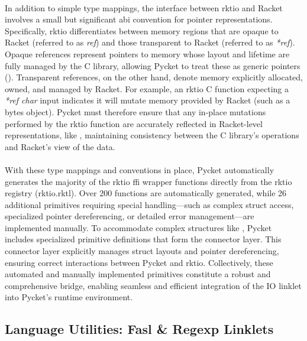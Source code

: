 				\paragraph{}%
					In addition to simple type mappings, the interface between rktio and Racket involves a small but significant \gls{abi} convention for pointer representations. Specifically, rktio differentiates between memory regions that are opaque to Racket (referred to as \emph{ref}) and those transparent to Racket (referred to as \emph{*ref}). Opaque references represent pointers to memory whose layout and lifetime are fully managed by the C library, allowing Pycket to treat these as generic pointers (). Transparent references, on the other hand, denote memory explicitly allocated, owned, and managed by Racket. For example, an rktio C function expecting a \emph{*ref char} input indicates it will mutate memory provided by Racket (such as a bytes object). Pycket must therefore ensure that any in-place mutations performed by the rktio function are accurately reflected in Racket-level representations, like , maintaining consistency between the C library's operations and Racket’s view of the data.

				\paragraph{}%
					With these type mappings and conventions in place, Pycket automatically generates the majority of the rktio \gls{ffi} wrapper functions directly from the rktio registry (rktio.rktl). Over 200 functions are automatically generated, while 26 additional primitives requiring special handling—such as complex struct access, specialized pointer dereferencing, or detailed error management—are implemented manually. To accommodate complex structures like , Pycket includes specialized primitive definitions that form the connector layer. This connector layer explicitly manages struct layouts and pointer dereferencing, ensuring correct interactions between Pycket and rktio. Collectively, these automated and manually implemented primitives constitute a robust and comprehensive bridge, enabling seamless and efficient integration of the IO linklet into Pycket's runtime environment.


		\subsection{Language Utilities: Fasl \& Regexp Linklets}

